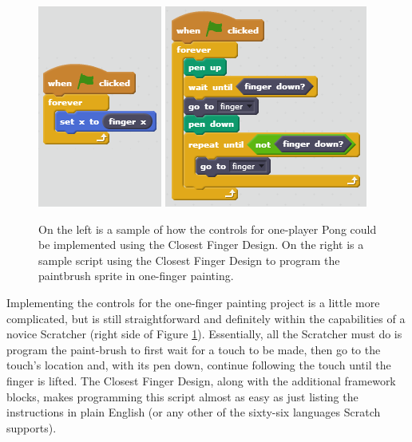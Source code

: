\begin{figure}
\centering
\includegraphics{images/OnePlayerPongCFD.PNG}
\includegraphics{images/OneFingerPaintingCFD.PNG}
\caption[Sample Closest Finger Design Scripts for Low Floor Case Projects]{On the left is a sample of how the controls for one-player Pong could be implemented using the Closest Finger Design. On the right is a sample script using the Closest Finger Design to program the paintbrush sprite in one-finger painting.}
\label{OnePlayerPongCFDOneFingerPaintingCFD}
\end{figure}

Implementing the controls for the one-finger painting project is a little more complicated, but is still straightforward and definitely within the capabilities of a novice Scratcher (right side of Figure \ref{OnePlayerPongCFDOneFingerPaintingCFD}). Essentially, all the Scratcher must do is program the paint-brush to first wait for a touch to be made, then go to the touch's location and, with its pen down, continue following the touch until the finger is lifted. The Closest Finger Design, along with the additional framework blocks, makes programming this script almost as easy as just listing the instructions in plain English (or any other of the sixty-six languages Scratch supports).

